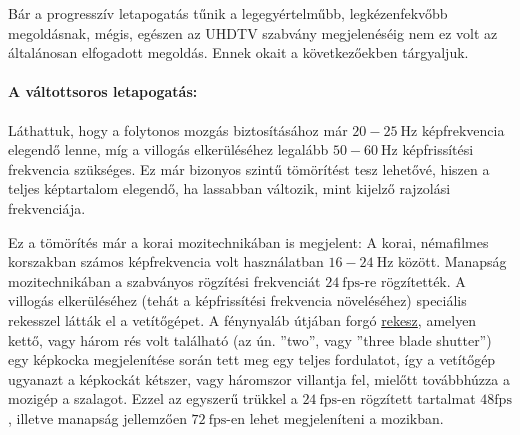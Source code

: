 Bár a progresszív letapogatás tűnik a legegyértelműbb, legkézenfekvőbb megoldásnak, mégis, egészen az UHDTV szabvány megjelenéséig nem ez volt az általánosan elfogadott megoldás.
Ennek okait a következőekben tárgyaljuk.

\vspace{3mm}
\paragraph{A váltottsoros letapogatás:}
Láthattuk, hogy a folytonos mozgás biztosításához már $20-25~\mathrm{Hz}$ képfrekvencia elegendő lenne, míg a villogás elkerüléséhez legalább $50-60~\mathrm{Hz}$ képfrissítési frekvencia szükséges.
Ez már bizonyos szintű tömörítést tesz lehetővé, hiszen a teljes képtartalom elegendő, ha lassabban változik, mint kijelző rajzolási frekvenciája.


Ez a tömörítés már a korai mozitechnikában is megjelent: 
A korai, némafilmes korszakban számos képfrekvencia volt használatban $16-24~\mathrm{Hz}$ között.
Manapság mozitechnikában a szabványos rögzítési frekvenciát $24~\mathrm{fps}$-re rögzítették.
A villogás elkerüléséhez (tehát a képfrissítési frekvencia növeléséhez) speciális rekesszel látták el a vetítőgépet.
A fénynyaláb útjában forgó \href{https://www.youtube.com/watch?v=jrSzRAch930}{rekesz}, amelyen kettő, vagy három rés volt található (az ún. ''two'', vagy ''three blade shutter'') egy képkocka megjelenítése során tett meg egy teljes fordulatot, így a vetítőgép ugyanazt a képkockát kétszer, vagy háromszor villantja fel, mielőtt továbbhúzza a mozigép a szalagot.
Ezzel az egyszerű trükkel a $24~\mathrm{fps}$-en rögzített tartalmat $48\mathrm{fps}$, illetve manapság jellemzően $72~\mathrm{fps}$-en lehet megjeleníteni a mozikban.


